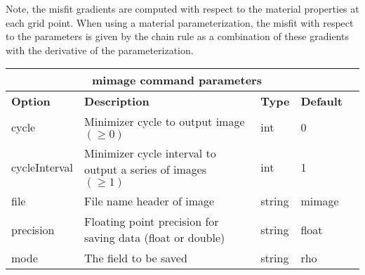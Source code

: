 \documentclass[12pt]{report}
\begin{document}
Note, the misfit gradients are computed with respect to the material properties at each grid point.
When using a material parameterization, the misfit with respect to the parameters is given by the chain
rule as a combination of these gradients with the derivative of the parameterization. \par
\begin{center}
\begin{tabular}{|l|p{8cm}|l|l|l|} \hline
\multicolumn{4}{|c|}{\bf mimage command parameters}\\ \hline
{\bf Option} & {\bf Description}          & {\bf Type} & {\bf Default} \\ \hline 
\hline
cycle         & Minimizer cycle to output image $(\geq 0)$                     & int    & 0 \\ \hline
cycleInterval & Minimizer cycle interval to output a series of images $(\geq 1)$ & int   & 1 \\ \hline
file          & File name header of image                                   & string & mimage \\ \hline
precision     & Floating point precision for saving data (float or double)  & string & float \\ \hline
mode          & The field to be saved                                       & string & rho \\ \hline
\end{tabular}
\end{center}


 
\end{document}
